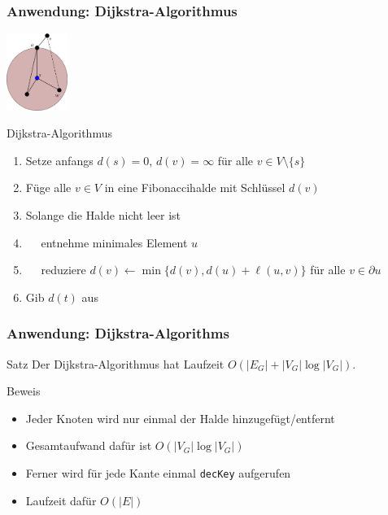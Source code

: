 \documentclass[aspectratio=1610, 11pt]{beamer}
\begin{document}
\begin{frame}\frametitle{Anwendung: Dijkstra-Algorithmus}
	\hfill\includegraphics[height=25mm]{images/DijkstraIllustr.pdf}
	\begin{exampleblock}{Dijkstra-Algorithmus}
		\begin{enumerate}
			\item Setze anfangs $d(s)=0$, $d(v)=\infty$ f\"ur alle $v\in V\setminus\{s\}$
			\item F\"uge alle $v\in V$ in eine Fibonaccihalde mit Schl\"ussel $d(v)$
			\item Solange die Halde nicht leer ist
			\item $\quad$ entnehme minimales Element $u$
			\item $\quad$ reduziere $d(v)\leftarrow \min\{d(v),d(u)+\ell(u,v)\}$ f\"ur alle $v\in\partial u$
			\item Gib $d(t)$ aus
		\end{enumerate}
	\end{exampleblock}
\end{frame}

\begin{frame}\frametitle{Anwendung: Dijkstra-Algorithms}
	\begin{block}{Satz}
		Der Dijkstra-Algorithmus hat Laufzeit $O(|E_G|+|V_G|\log|V_G|)$. 
	\end{block}
	\begin{overprint}
		\begin{exampleblock}{Beweis}
			\begin{itemize}
				\item Jeder Knoten wird nur einmal der Halde hinzugef\"ugt/entfernt
				\item Gesamtaufwand daf\"ur ist $O(|V_G|\log|V_G|)$
				\item Ferner wird f\"ur jede Kante einmal {\tt decKey} aufgerufen
				\item Laufzeit daf\"ur $O(|E|)$
			\end{itemize}
		\end{exampleblock}
	\end{overprint}
\end{frame}
\end{document}
